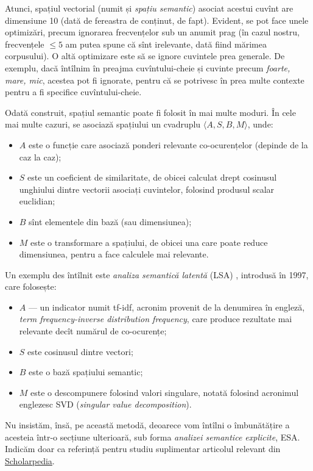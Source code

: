 Atunci, spațiul vectorial (numit și \emph{spațiu semantic}) asociat acestui
cuvînt are dimensiune 10 (dată de fereastra de conținut, de fapt). Evident,
se pot face unele optimizări, precum ignorarea frecvențelor sub un anumit
prag (în cazul nostru, frecvențele $ \leq 5 $ am putea spune că sînt irelevante,
dată fiind mărimea corpusului). O altă optimizare este să se ignore cuvintele
prea generale. De exemplu, dacă întîlnim în preajma cuvîntului-cheie și cuvinte
precum \emph{foarte, mare, mic}, acestea pot fi ignorate, pentru că se potrivesc
în prea multe contexte pentru a fi specifice cuvîntului-cheie.

Odată construit, spațiul semantic poate fi folosit în mai multe moduri. În cele
mai multe cazuri, se asociază spațiului un cvadruplu $ \langle A, S, B, M \rangle $,
unde:
\begin{itemize}
\item $ A $ este o funcție care asociază ponderi relevante co-ocurențelor
  (depinde de la caz la caz);
\item $ S $ este un coeficient de similaritate, de obicei calculat drept
  cosinusul unghiului dintre vectorii asociați cuvintelor, folosind
  produsul scalar euclidian;
\item $ B $ sînt elementele din bază (sau dimensiunea);
\item $ M $ este o transformare a spațiului, de obicei una care poate
  reduce dimensiunea, pentru a face calculele mai relevante.
\end{itemize}

Un exemplu des întîlnit este \emph{analiza semantică latentă} (LSA) , introdusă
în 1997, care folosește:
\begin{itemize}
\item $ A $ --- un indicator numit tf-idf, acronim provenit de la denumirea
  în engleză, \emph{term freq\-uency-inverse distribution frequency}, care
  produce rezultate mai relevante decît numărul de co-ocurențe;
\item $ S $ este cosinusul dintre vectori;
\item $ B $ este o bază spațiului semantic;
\item $ M $ este o descompunere folosind valori singulare, notată folosind
  acronimul englezesc SVD (\emph{singular value decomposition}).
\end{itemize}

Nu insistăm, însă, pe această metodă, deoarece vom întîlni o îmbunătățire
a acesteia într-o secțiune ulterioară, sub forma \emph{analizei semantice %
  explicite}, ESA. Indicăm doar ca referință pentru studiu suplimentar
articolul relevant din
\href{http://www.scholarpedia.org/article/Latent_semantic_analysis}{Scholarpedia}.

